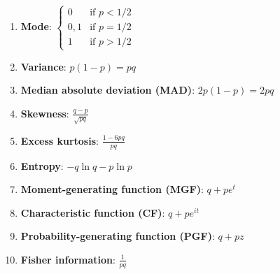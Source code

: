 \begin{enumerate}
    \item \textbf{Mode}: 
    $
         {\displaystyle {\begin{cases}0&{\text{if }}p<1/2\\0,1&{\text{if }}p=1/2\\1&{\text{if }}p>1/2\end{cases}}}
    $
    \hfill \cite{wiki/Bernoulli_distribution}

    \item \textbf{Variance}: 
    $ 
         {\displaystyle p(1-p)=pq}
    $
    \hfill \cite{wiki/Bernoulli_distribution}

    \item \textbf{Median absolute deviation (MAD)}: 
    $
         {\displaystyle 2p(1-p)=2pq}
    $
    \hfill \cite{wiki/Bernoulli_distribution}

    \item \textbf{Skewness}:
    $
         {\displaystyle {\frac {q-p}{\sqrt {pq}}}}
    $
    \hfill \cite{wiki/Bernoulli_distribution}

    \item \textbf{Excess kurtosis}: 
    $
         {\displaystyle {\frac {1-6pq}{pq}}}
    $
    \hfill \cite{wiki/Bernoulli_distribution}

    \item \textbf{Entropy}: 
    $
         {\displaystyle -q\ln q-p\ln p}
    $
    \hfill \cite{wiki/Bernoulli_distribution}

    \item \textbf{Moment-generating function (MGF)}: 
    $
         {\displaystyle q+pe^{t}}
    $
    \hfill \cite{wiki/Bernoulli_distribution}
    
    \item \textbf{Characteristic function (CF)}:
    $
         {\displaystyle q+pe^{it}}
    $
    \hfill \cite{wiki/Bernoulli_distribution}

    \item \textbf{Probability-generating function (PGF)}:
    $
         {\displaystyle q+pz}    
    $
    \hfill \cite{wiki/Bernoulli_distribution}

    \item \textbf{Fisher information}:
    $
         {\displaystyle {\frac {1}{pq}}}
    $
    \hfill \cite{wiki/Bernoulli_distribution}
\end{enumerate}





